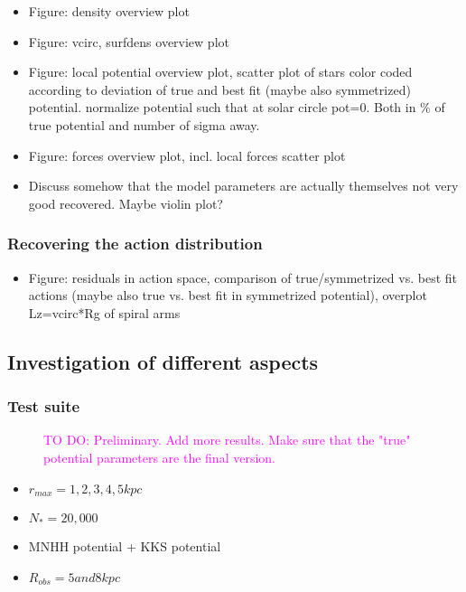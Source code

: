 \documentclass[iop,revtex4,numberedappendix,appendixfloats]{emulateapj}
\newcommand{\Wilma}[1]{\textcolor{Magenta}{#1}}
\begin{document}
\begin{itemize}
\item Figure: density overview plot
\item Figure: vcirc, surfdens overview plot
\item Figure: local potential overview plot, scatter plot of stars color coded according to deviation of true and best fit (maybe also symmetrized) potential. normalize potential such that at solar circle pot=0. Both in \% of true potential and number of sigma away.
\item Figure: forces overview plot, incl. local forces scatter plot
\item Discuss somehow that the model parameters are actually themselves not very good recovered. Maybe violin plot?
\end{itemize}

\subsubsection{Recovering the action distribution}

\begin{itemize}
\item Figure: residuals in action space, comparison of true/symmetrized vs. best fit actions (maybe also true vs. best fit in symmetrized potential), overplot Lz=vcirc*Rg of spiral arms
\end{itemize}

\subsection{Investigation of different aspects}

\subsubsection{Test suite}

\begin{figure*}[!htbp]
\caption{\Wilma{TO DO: Preliminary. Add more results. Make sure that the "true" potential parameters are the final version.}}
\label{fig:simulation}
\end{figure*}

\begin{itemize}
\item $r_{max}=1,2,3,4,5kpc$
\item $N_*=20,000$
\item MNHH potential + KKS potential
\item $R_{obs} =5 and 8 kpc$
\end{itemize}
\end{document}

